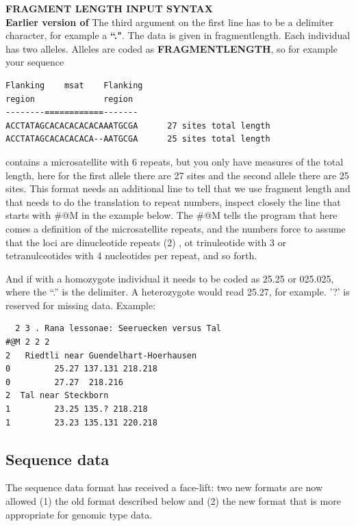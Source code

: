 {\bf FRAGMENT LENGTH INPUT SYNTAX}\\
{\bf Earlier version of }
The third argument on the first line has to be a delimiter character, for example a {\bf ``."}.
The data is given in fragmentlength. Each individual has two alleles.
Alleles are coded as \textbf{FRAGMENTLENGTH}, so for example your 
sequence 
\begin{verbatim}
Flanking    msat    Flanking
region              region 
--------============-------
ACCTATAGCACACACACACAAATGCGA      27 sites total length
ACCTATAGCACACACACA--AATGCGA      25 sites total length
\end{verbatim}
contains a microsatellite with 6 repeats, but you only have measures of the total length, here for the first allele there are 27 sites and the second allele there are 25 sites. This format needs an additional line to tell \migrate that we use fragment length and that \migrate needs to do the translation to repeat numbers, inspect closely the line that starts with \#@M in the example below. The \#@M tells the program that here comes a definition of the 
microsatellite repeats, and the numbers force \migrate to assume that the loci are dinucleotide repeats (2) , ot trinuleotide with 3 or tetranulceotides with 4 nucleotides per repeat, and so forth. 

And if with a homozygote individual
it needs to be coded as 25.25 or 025.025, where the ``.'' is the delimiter. A heterozygote would read 25.27, for example.
 '?' is reserved for missing data.
\smallerskip
Example:
\begin{flushleft}
\begin{small}
\begin{tt}
\begin{verbatim}
  2 3 . Rana lessonae: Seeruecken versus Tal
#@M 2 2 2
2   Riedtli near Guendelhart-Hoerhausen
0         25.27 137.131 218.218
0         27.27  218.216
2  Tal near Steckborn
1         23.25 135.? 218.218 
1         23.23 135.131 220.218 
\end{verbatim}
\end{tt}
\end{small}
\end{flushleft}
\subsection{Sequence data}
The sequence data format has received a face-lift: two new formats are now allowed (1) the old format described below and (2) the new format that is more appropriate for genomic type data.

